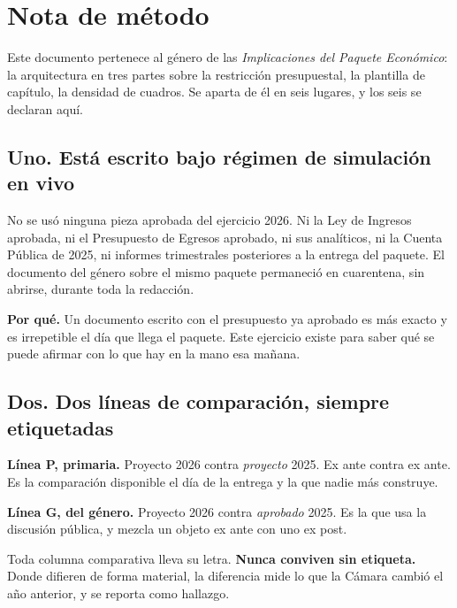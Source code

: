 \chapter*{Nota de método}

Este documento pertenece al género de las \emph{Implicaciones del Paquete Económico}: la
arquitectura en tres partes sobre la restricción presupuestal, la plantilla de capítulo, la
densidad de cuadros. Se aparta de él en seis lugares, y los seis se declaran aquí.

\section*{Uno. Está escrito bajo régimen de simulación en vivo}

No se usó ninguna pieza aprobada del ejercicio 2026. Ni la Ley de Ingresos aprobada, ni el
Presupuesto de Egresos aprobado, ni sus analíticos, ni la Cuenta Pública de 2025, ni informes
trimestrales posteriores a la entrega del paquete. El documento del género sobre el mismo
paquete permaneció en cuarentena, sin abrirse, durante toda la redacción.

\textbf{Por qué.} Un documento escrito con el presupuesto ya aprobado es más exacto y es
irrepetible el día que llega el paquete. Este ejercicio existe para saber qué se puede
afirmar con lo que hay en la mano esa mañana.

\section*{Dos. Dos líneas de comparación, siempre etiquetadas}

\begin{list}{}{\setlength{\leftmargin}{1.2em}}
\item[] \textbf{Línea P, primaria.} Proyecto 2026 contra \emph{proyecto} 2025. Ex ante contra
ex ante. Es la comparación disponible el día de la entrega y la que nadie más construye.
\item[] \textbf{Línea G, del género.} Proyecto 2026 contra \emph{aprobado} 2025. Es la que usa
la discusión pública, y mezcla un objeto ex ante con uno ex post.
\end{list}

Toda columna comparativa lleva su letra. \textbf{Nunca conviven sin etiqueta.} Donde difieren de
forma material, la diferencia mide lo que la Cámara cambió el año anterior, y se reporta como
hallazgo.

